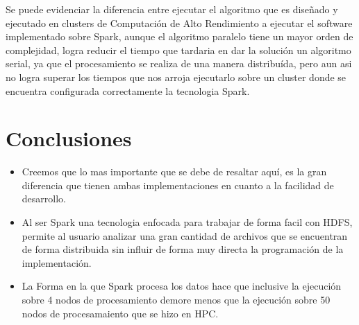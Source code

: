\documentclass[fleqn,10pt]{SelfArx} %
\begin{document}
Se puede evidenciar la diferencia entre ejecutar el algoritmo que es diseñado y ejecutado en clusters de Computación de Alto Rendimiento a ejecutar el software implementado sobre Spark, aunque el algoritmo paralelo tiene un mayor orden de complejidad, logra reducir el tiempo que tardaria en dar la solución un algoritmo serial, ya que el procesamiento se realiza de una manera distribuída, pero aun asi no logra superar los tiempos que nos arroja ejecutarlo sobre un cluster donde se encuentra configurada correctamente la tecnologia Spark.


\section*{Conclusiones} %

\begin{itemize}
	\item Creemos que lo mas importante que se debe de resaltar aquí, es la gran diferencia que tienen ambas implementaciones en cuanto a la facilidad de desarrollo.
	\item  Al ser Spark una tecnologia enfocada para trabajar de forma facil con HDFS, permite al usuario analizar una gran cantidad de archivos que se encuentran de forma distribuida sin influir de forma muy directa la programación de la implementación.
	\item La Forma en la que Spark procesa los datos hace que inclusive la ejecución sobre 4 nodos de procesamiento demore menos que la ejecución sobre 50 nodos de procesamaiento que se hizo en HPC.
\end{itemize}

\end{document}
